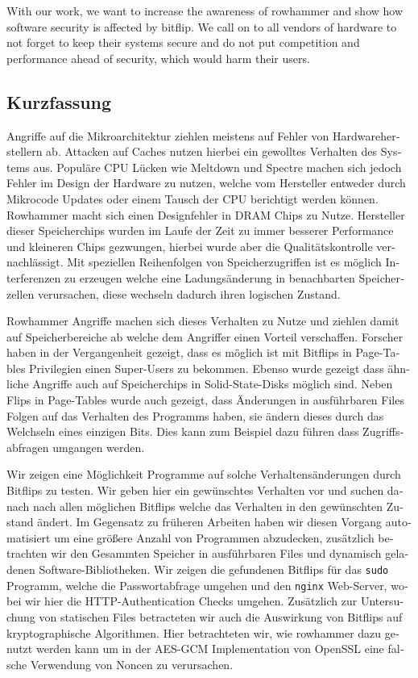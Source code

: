 With our work, we want to increase the awareness of rowhammer and show how
software security is affected by bitflip. We call on to all vendors of hardware
to not forget to keep their systems secure and do not put competition and
performance ahead of security, which would harm their users.
\cleardoublepage
{}
{}
\begin{otherlanguage}{ngerman}
\chapter*{Kurzfassung}
\label{cha:kurzfassung}

Angriffe auf die Mikroarchitektur ziehlen meistens auf Fehler von
Hardwareherstellern ab. Attacken auf Caches nutzen hierbei ein gewolltes
Verhalten des Systems aus. Populäre CPU Lücken wie Meltdown und Spectre machen
sich jedoch Fehler im Design der Hardware zu nutzen, welche vom Hersteller
entweder durch Mikrocode Updates oder einem Tausch der CPU berichtigt werden
können. Rowhammer macht sich einen Designfehler in DRAM Chips zu Nutze.
Hersteller dieser Speicherchips wurden im Laufe der Zeit zu immer besserer
Performance und kleineren Chips gezwungen, hierbei wurde aber die
Qualitätskontrolle vernachlässigt. Mit speziellen Reihenfolgen von
Speicherzugriffen ist es möglich Interferenzen zu erzeugen welche eine
Ladungsänderung in benachbarten Speicherzellen verursachen, diese wechseln
dadurch ihren logischen Zustand.

Rowhammer Angriffe machen sich dieses Verhalten zu Nutze und ziehlen damit auf
Speicherbereiche ab welche dem Angriffer einen Vorteil verschaffen. Forscher
haben in der Vergangenheit gezeigt, dass es möglich ist mit Bitflips in
Page-Tables Privilegien einen Super-Users zu bekommen. Ebenso wurde gezeigt
dass ähnliche Angriffe auch auf Speicherchips in Solid-State-Disks möglich
sind. Neben Flips in Page-Tables wurde auch gezeigt, dass Änderungen in
ausführbaren Files Folgen auf das Verhalten des Programms haben, sie ändern
dieses durch das Welchseln eines einzigen Bits. Dies kann zum Beispiel dazu
führen dass Zugriffsabfragen umgangen werden.

Wir zeigen eine Möglichkeit Programme auf solche Verhaltensänderungen durch
Bitflips zu testen. Wir geben hier ein gewünschtes Verhalten vor und suchen
danach nach allen möglichen Bitflips welche das Verhalten in den gewünschten
Zustand ändert. Im Gegensatz zu früheren Arbeiten haben wir diesen Vorgang
automatisiert um eine größere Anzahl von Programmen abzudecken, zusätzlich
betrachten wir den Gesammten Speicher in ausführbaren Files und dynamisch
geladenen Software-Bibliotheken. Wir zeigen die gefundenen Bitflips für das
\texttt{sudo} Programm, welche die Passwortabfrage umgehen und den
\texttt{nginx} Web-Server, wobei wir hier die HTTP-Authentication Checks
umgehen. Zusätzlich zur Untersuchung von statischen Files betracteten wir auch
die Auswirkung von Bitflips auf kryptographische Algorithmen. Hier betrachteten
wir, wie rowhammer dazu genutzt werden kann um in der AES-GCM Implementation von
OpenSSL eine falsche Verwendung von Noncen zu verursachen.


\end{otherlanguage}
